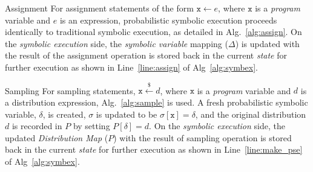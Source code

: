 \begin{algorithm}[H]
	\caption{PSE Assignment Algorithm}
	\label{alg:assign}
	\begin{algorithmic}[1]
		\State{}
		\EndFunction
	\end{algorithmic}
\end{algorithm}

\begin{paragraph}{Assignment}
	For assignment statements of the form $\mathtt{x} \leftarrow e$, where $\mathtt{x}$ is a \textit{program} variable and $e$ is an expression, probabilistic symbolic execution proceeds identically to traditional symbolic execution, as detailed in Alg.~\ref{alg:assign}.
	On the \textit{symbolic execution} side, the \textit{symbolic variable} mapping ($\Delta$) is updated with the result of the assignment operation is stored back in the current \textit{state} for further execution as shown in Line~\ref{line:assign} of Alg~\ref{alg:symbex}.
\end{paragraph}

\begin{algorithm}
	\caption{PSE Sampling Algorithm}
	\label{alg:sample}
	\begin{algorithmic}[1]
		\State{$\sigma[\mathtt{x}] = \delta$}
		\State{}
		\EndFunction
	\end{algorithmic}
\end{algorithm}

\begin{paragraph}{Sampling}
	For sampling statements, $\mathtt{x} \xleftarrow{\$} d$, where $\mathtt{x}$ is a \textit{program} variable and $d$ is a distribution expression, Alg.~\ref{alg:sample} is used.
	A fresh probabilistic symbolic variable, $\delta$, is created, $\sigma$ is updated to be $\sigma[\mathtt{x}] = \delta$, and the original distribution $d$ is recorded in $P$ by setting $P[\delta] = d$.
	On the \textit{symbolic execution} side, the updated \textit{Distribution Map} ($P$) with the result of sampling operation is stored back in the current \textit{state} for further execution as shown in Line~\ref{line:make_pse} of Alg~\ref{alg:symbex}.  
\end{paragraph}

